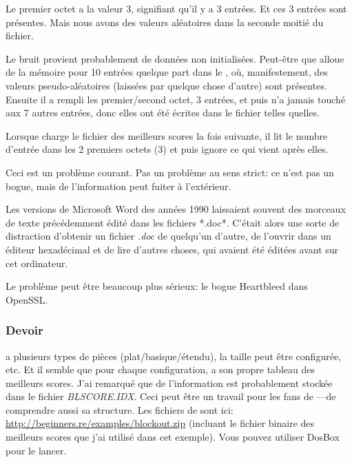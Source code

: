 Le premier octet a la valeur 3, signifiant qu'il y a 3 entrées.
Et ces 3 entrées sont présentes.
Mais nous avons des valeurs aléatoires dans la seconde moitié du fichier.

Le bruit provient probablement de données non initialisées.
Peut-être que  alloue de la mémoire pour 10 entrées quelque part dans
le , où, manifestement, des valeurs pseudo-aléatoires (laissées
par quelque chose d'autre) sont présentes.
Ensuite il a rempli les premier/second octet, 3 entrées, et puis n'a jamais touché
aux 7 autres entrées, donc elles ont été écrites dans le fichier telles quelles.

Lorsque  charge le fichier des meilleurs scores la fois suivante, il
lit le nombre d'entrée dans les 2 premiers octets (3) et puis ignore ce qui vient
après elles.

Ceci est un problème courant.
Pas un problème au sens strict: ce n'est pas un bogue, mais de l'information peut
fuiter à l'extérieur.

Les versions de Microsoft Word des années 1990 laissaient souvent des morceaux de
texte précédemment édité dans les fichiers *.doc*.
C'était alors une sorte de distraction d'obtenir un fichier \emph{.doc} de quelqu'un
d'autre, de l'ouvrir dans un éditeur hexadécimal et de lire d'autres choses, qui
avaient été éditées avant sur cet ordinateur.

Le problème peut être beaucoup plus sérieux: le bogue Heartbleed
dans OpenSSL.

\subsubsection{Devoir}

 a plusieurs types de pièces (plat/basique/étendu), la taille peut être configurée, etc.
Et il semble que pour chaque configuration,  a son propre tableau des
meilleurs scores.
J'ai remarqué que de l'information est probablement stockée dans le fichier \emph{BLSCORE.IDX}.
Ceci peut être un travail pour les fans de ---de comprendre aussi sa
structure.
Les fichiers de  sont ici: \url{http://beginners.re/examples/blockout.zip}
(incluant le fichier binaire des meilleurs scores que j'ai utilisé dans cet exemple).
Vous pouvez utiliser DosBox pour le lancer.

